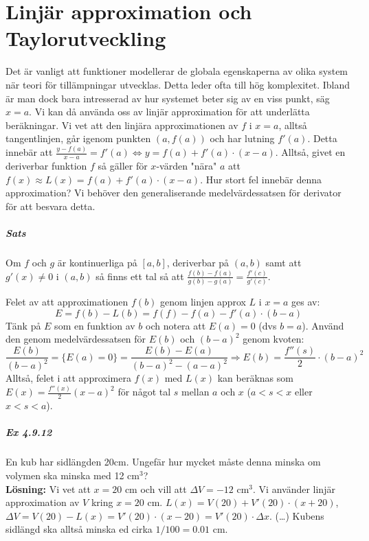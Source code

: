 \chapter{Linjär approximation och Taylorutveckling}
Det är vanligt att funktioner modellerar de globala egenskaperna av olika system när teori för tillämpningar utvecklas.
Detta leder ofta till hög komplexitet.
Ibland är man dock bara intresserad av hur systemet beter sig av en viss punkt, säg $x=a$.
Vi kan då använda oss av linjär approximation för att underlätta beräkningar.
Vi vet att den linjära approximationen av $f$ i $x=a$, alltså tangentlinjen, går igenom punkten $(a,f(a))$ och har lutning $f'(a)$.
Detta innebär att $\frac{y-f(a)}{x-a}=f'(a)\Leftrightarrow y=f(a)+f'(a)\cdot (x-a)$.
Alltså, givet en deriverbar funktion $f$ så gäller för $x$-värden "nära" $a$ att $f(x)\approx L(x)=f(a)+f'(a)\cdot (x-a)$.
Hur stort fel innebär denna approximation?
Vi behöver den generaliserande medelvärdessatsen för derivator för att besvara detta.

\paragraph{Sats}
Om $f$ och $g$ är kontinuerliga på $[a,b]$, deriverbar på $(a,b)$ samt att $g'(x)\neq 0$ i $(a,b)$ så finns ett tal så att $\frac{f(b)-f(a)}{g(b)-g(a)}=\frac{f'(c)}{g'(c)}$.

Felet av att approximationen $f(b)$ genom linjen approx $L$ i $x=a$ ges av:
$$E=f(b)-L(b)=f(f)-f(a)-f'(a)\cdot (b-a)$$
Tänk på $E$ som en funktion av $b$ och notera att $E(a)=0$ (dvs $b=a$).
Använd den genom medelvärdessatsen för $E(b)$ och $(b-a)^2$ genom kvoten:
$$\frac{E(b)}{(b-a)^2}=\{E(a)=0\}=\frac{E(b)-E(a)}{(b-a)^2-(a-a)^2} \Rightarrow E(b)=\frac{f''(s)}{2}\cdot (b-a)^2$$
Alltså, felet i att approximera $f(x)$ med $L(x)$ kan beräknas som $E(x)=\frac{f''(x)}{2}(x-a)^2$ för något tal $s$ mellan $a$ och $x$ ($a<s<x$ eller $x<s<a$).
\paragraph{Ex 4.9.12} En kub har sidlängden 20cm.
Ungefär hur mycket måste denna minska om volymen ska minska med 12 cm$^3$?\\
\textbf{Lösning:} Vi vet att $x=20$ cm och vill att $\Delta V=-12$ cm$^3$.
Vi använder linjär approximation av $V$ kring $x=20$ cm.
$L(x)=V(20)+V'(20)\cdot(x+20)$, $\Delta V = V(20)-L(x)=V'(20)\cdot(x-20)=V'(20)\cdot\Delta x$. (\dots)
Kubens sidlängd ska alltså minska ed cirka $1/100=0.01$ cm.

